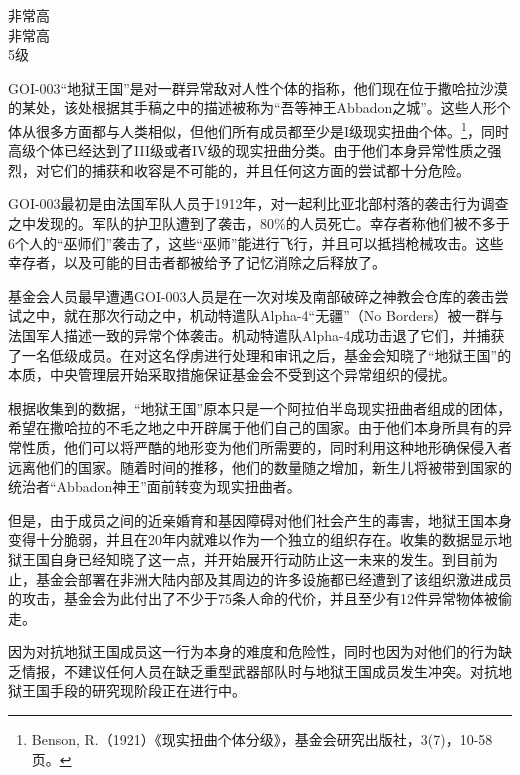 

\begin{scpboxbbwm}



非常高 \\
非常高 \\
5级

GOI-003“地狱王国”是对一群异常敌对人性个体的指称，他们现在位于撒哈拉沙漠的某处，该处根据其手稿之中的描述被称为“吾等神王Abbadon之城”。这些人形个体从很多方面都与人类相似，但他们所有成员都至少是I级现实扭曲个体。\footnote{Benson, R.（1921）《现实扭曲个体分级》，基金会研究出版社，3(7)，10-58页。}，同时高级个体已经达到了III级或者IV级的现实扭曲分类。由于他们本身异常性质之强烈，对它们的捕获和收容是不可能的，并且任何这方面的尝试都十分危险。

GOI-003最初是由法国军队人员于1912年，对一起利比亚北部村落的袭击行为调查之中发现的。军队的护卫队遭到了袭击，80\%的人员死亡。幸存者称他们被不多于6个人的“巫师们”袭击了，这些“巫师”能进行飞行，并且可以抵挡枪械攻击。这些幸存者，以及可能的目击者都被给予了记忆消除之后释放了。

基金会人员最早遭遇GOI-003人员是在一次对埃及南部破碎之神教会仓库的袭击尝试之中，就在那次行动之中，机动特遣队Alpha-4“无疆”（No Borders）被一群与法国军人描述一致的异常个体袭击。机动特遣队Alpha-4成功击退了它们，并捕获了一名低级成员。在对这名俘虏进行处理和审讯之后，基金会知晓了“地狱王国”的本质，中央管理层开始采取措施保证基金会不受到这个异常组织的侵扰。

根据收集到的数据，“地狱王国”原本只是一个阿拉伯半岛现实扭曲者组成的团体，希望在撒哈拉的不毛之地之中开辟属于他们自己的国家。由于他们本身所具有的异常性质，他们可以将严酷的地形变为他们所需要的，同时利用这种地形确保侵入者远离他们的国家。随着时间的推移，他们的数量随之增加，新生儿将被带到国家的统治者“Abbadon神王”面前转变为现实扭曲者。

但是，由于成员之间的近亲婚育和基因障碍对他们社会产生的毒害，地狱王国本身变得十分脆弱，并且在20年内就难以作为一个独立的组织存在。收集的数据显示地狱王国自身已经知晓了这一点，并开始展开行动防止这一未来的发生。到目前为止，基金会部署在非洲大陆内部及其周边的许多设施都已经遭到了该组织激进成员的攻击，基金会为此付出了不少于75条人命的代价，并且至少有12件异常物体被偷走。

因为对抗地狱王国成员这一行为本身的难度和危险性，同时也因为对他们的行为缺乏情报，不建议任何人员在缺乏重型武器部队时与地狱王国成员发生冲突。对抗地狱王国手段的研究现阶段正在进行中。

\end{scpboxbbwm}

